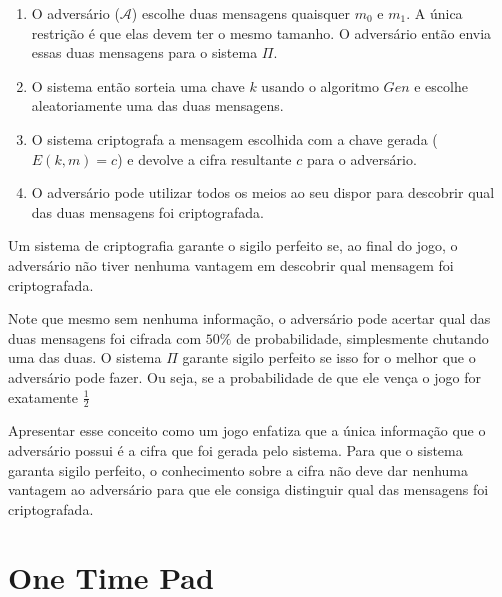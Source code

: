 \begin{enumerate}
\item O adversário ($\mathcal{A}$) escolhe duas mensagens quaisquer $m_0$ e $m_1$.
  A única restrição é que elas devem ter o mesmo tamanho.
  O adversário então envia essas duas mensagens para o sistema $\Pi$.
\item O sistema então sorteia uma chave $k$ usando o algoritmo $Gen$ e escolhe aleatoriamente uma das duas mensagens.
\item O sistema criptografa a mensagem escolhida com a chave gerada  ($E(k,m) = c$) e devolve a cifra resultante $c$ para o adversário.
\item O adversário pode utilizar todos os meios ao seu dispor para descobrir qual das duas mensagens foi criptografada.
\end{enumerate}

Um sistema de criptografia garante o sigilo perfeito se, ao final do jogo, o adversário não tiver nenhuma vantagem em descobrir qual mensagem foi criptografada.

\begin{center}
\end{center}

Note que mesmo sem nenhuma informação, o adversário pode acertar qual das duas mensagens foi cifrada com $50\%$ de probabilidade, simplesmente chutando uma das duas.
O sistema $\Pi$ garante sigilo perfeito se isso for o melhor que o adversário pode fazer.
Ou seja, se a probabilidade de que ele vença o jogo for exatamente $\frac{1}{2}$

Apresentar esse conceito como um jogo enfatiza que a única informação que o adversário possui é a cifra que foi gerada pelo sistema.
Para que o sistema garanta sigilo perfeito, o conhecimento sobre a cifra não deve dar nenhuma vantagem ao adversário para que ele consiga distinguir qual das mensagens foi criptografada.

\section{One Time Pad}
\label{sec:otp}

